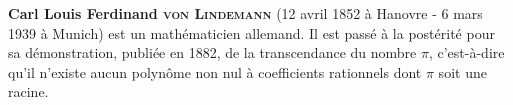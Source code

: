 \begin{His}
\textbf{Carl Louis Ferdinand \textsc{von Lindemann}} (12 avril 1852 à Hanovre - 6 mars 1939 à Munich) est un mathématicien allemand. Il est passé à la postérité pour sa démonstration, publiée en 1882, de la transcendance du nombre $\pi$, c'est-à-dire qu'il n'existe aucun polynôme non nul à coefficients rationnels dont $\pi$ soit une racine.



\end{His}
